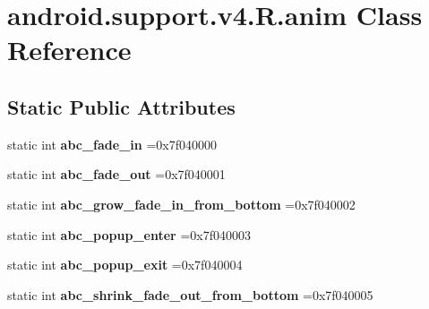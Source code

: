\hypertarget{classandroid_1_1support_1_1v4_1_1R_1_1anim}{}\section{android.\+support.\+v4.\+R.\+anim Class Reference}
\label{classandroid_1_1support_1_1v4_1_1R_1_1anim}
\subsection*{Static Public Attributes}
\begin{DoxyCompactItemize}
\item 
\mbox{\label{classandroid_1_1support_1_1v4_1_1R_1_1anim_af332d686134f89ca5e85cc8d9c8d12c4}} 
static int {\bfseries abc\+\_\+fade\+\_\+in} =0x7f040000
\item 
\mbox{\label{classandroid_1_1support_1_1v4_1_1R_1_1anim_ac1404541016a41bacf4eda920de81531}} 
static int {\bfseries abc\+\_\+fade\+\_\+out} =0x7f040001
\item 
\mbox{\label{classandroid_1_1support_1_1v4_1_1R_1_1anim_a80264ead69af98e4081700bccc344c76}} 
static int {\bfseries abc\+\_\+grow\+\_\+fade\+\_\+in\+\_\+from\+\_\+bottom} =0x7f040002
\item 
\mbox{\label{classandroid_1_1support_1_1v4_1_1R_1_1anim_a45004d19844c6e77b7bddcdd8983cefb}} 
static int {\bfseries abc\+\_\+popup\+\_\+enter} =0x7f040003
\item 
\mbox{\label{classandroid_1_1support_1_1v4_1_1R_1_1anim_ab68b7e0248eb72715a450ef7710e3bdb}} 
static int {\bfseries abc\+\_\+popup\+\_\+exit} =0x7f040004
\item 
\mbox{\label{classandroid_1_1support_1_1v4_1_1R_1_1anim_a44b46a5ee27d7e0f215994777d848514}} 
static int {\bfseries abc\+\_\+shrink\+\_\+fade\+\_\+out\+\_\+from\+\_\+bottom} =0x7f040005
\item 
\mbox{\label{classandroid_1_1support_1_1v4_1_1R_1_1anim_a7da232100a0a79eb0e283ee088390248}} 

\end{DoxyCompactItemize}
